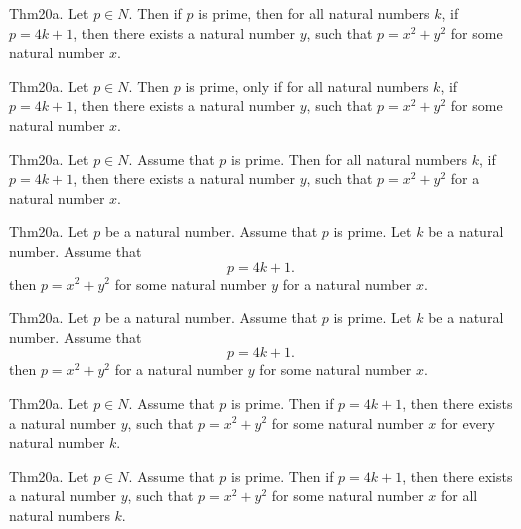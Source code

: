 \documentclass{article}
\begin{document}
Thm20a. Let $p \in N$. Then if $p$ is prime, then for all natural numbers $k$, if $p = 4 k + 1$, then there exists a natural number $y$, such that $p = x ^{ 2}+ y ^{ 2}$ for some natural number $x$.

Thm20a. Let $p \in N$. Then $p$ is prime, only if for all natural numbers $k$, if $p = 4 k + 1$, then there exists a natural number $y$, such that $p = x ^{ 2}+ y ^{ 2}$ for some natural number $x$.

Thm20a. Let $p \in N$. Assume that $p$ is prime. Then for all natural numbers $k$, if $p = 4 k + 1$, then there exists a natural number $y$, such that $p = x ^{ 2}+ y ^{ 2}$ for a natural number $x$.

Thm20a. Let $p$ be a natural number. Assume that $p$ is prime. Let $k$ be a natural number. Assume that $$p = 4 k + 1.$$ then $p = x ^{ 2}+ y ^{ 2}$ for some natural number $y$ for a natural number $x$.

Thm20a. Let $p$ be a natural number. Assume that $p$ is prime. Let $k$ be a natural number. Assume that $$p = 4 k + 1.$$ then $p = x ^{ 2}+ y ^{ 2}$ for a natural number $y$ for some natural number $x$.

Thm20a. Let $p \in N$. Assume that $p$ is prime. Then if $p = 4 k + 1$, then there exists a natural number $y$, such that $p = x ^{ 2}+ y ^{ 2}$ for some natural number $x$ for every natural number $k$.

Thm20a. Let $p \in N$. Assume that $p$ is prime. Then if $p = 4 k + 1$, then there exists a natural number $y$, such that $p = x ^{ 2}+ y ^{ 2}$ for some natural number $x$ for all natural numbers $k$.
\end{document}
